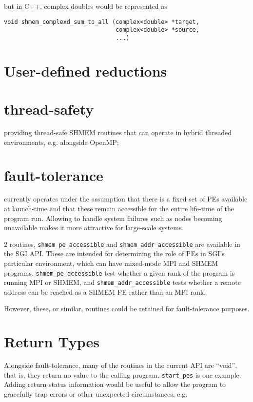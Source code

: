 but in C++, complex doubles would be represented as

\begin{lstlisting}[language=OSH+C]
void shmem_complexd_sum_to_all (complex<double> *target,
                                complex<double> *source,
                                ...)
\end{lstlisting}

\section{User-defined reductions}

\section{thread-safety}

providing thread-safe SHMEM routines that can operate in hybrid
threaded environments, e.g. alongside OpenMP;

\section{fault-tolerance}

\openshmem currently operates under the assumption that there is a
fixed set of PEs available at launch-time and that these remain
accessible for the entire life-time of the program run. Allowing
\openshmem to handle system failures such as nodes becoming
unavailable makes it more attractive for large-scale systems.

2 routines, \texttt{shmem\_pe\_accessible} and
\texttt{shmem\_addr\_accessible} are available in the SGI API.  These
are intended for determining the role of PEs in SGI's particular
environment, which can have mixed-mode MPI and SHMEM programs.
\texttt{shmem\_pe\_accessible} test whether a given rank of the
program is running MPI or SHMEM, and \texttt{shmem\_addr\_accessible}
tests whether a remote address can be reached as a SHMEM PE rather
than an MPI rank.

However, these, or similar, routines could be retained for
fault-tolerance purposes.

\section{Return Types}

Alongside fault-tolerance, many of the routines in the current API are
``void'', that is, they return no value to the calling program.
\texttt{start\_pes} is one example.  Adding return status information
would be useful to allow the program to gracefully trap errors or
other unexpected circumstances, e.g.

